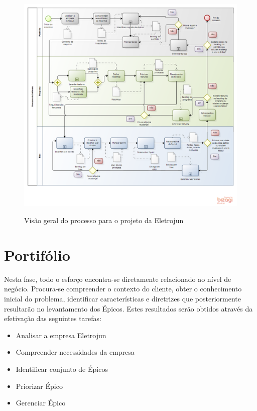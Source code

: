 \FloatBarrier
\begin{figure}[!htpd]
		\centering
		\caption{Visão geral do processo para o projeto da Eletrojun}
		\includegraphics[scale=0.55]{figuras/Eletrojun}
		\label{img:processoeletrojun}
\end{figure}
\FloatBarrier

\section {Portifólio}

Nesta fase, todo o esforço encontra-se diretamente relacionado ao nível de negócio. Procura-se compreender o contexto do cliente, obter o conhecimento inicial do problema, identificar características e diretrizes que posteriormente  resultarão no levantamento dos Épicos.  Estes resultados serão obtidos através da efetivação das seguintes tarefas:

\begin{itemize}
\item Analisar a empresa Eletrojun
\item Compreender necessidades da empresa
\item Identificar conjunto de Épicos
\item Priorizar Épico
\item Gerenciar Épico
\end{itemize}

